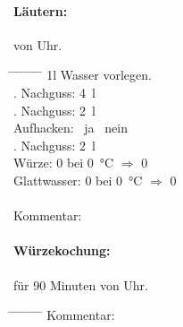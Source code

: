 \documentclass[12pt,oneside,a4paper]{scrartcl}
\begin{document}
{\paragraph{Läutern:} von  Uhr.
	\begin{tabbing}
		\hspace{1cm} \= \hspace{1cm} \= \hspace{1cm} \= \hspace{1cm} \= \hspace{1cm} \=\hspace{1cm} \=\hspace{1cm} \=\hspace{1cm} \= \kill
		\> 1l Wasser vorlegen.\\
		\> . Nachguss: \> \> \> \SI{4}{\litre}\\
		\> . Nachguss: \> \> \> \SI{2}{\litre}\\
		\> \> \> Aufhacken: \> \> \Square \ ja \> \> \Square \ nein\\
		\> . Nachguss: \> \> \> \SI{2}{\litre}\\
		\> Würze: \> \> \> \SI{0}{\plato} \> bei \> \SI{0}{\degreeCelsius} \> $\Rightarrow$ \> \SI{0}{\plato}\\
		\> Glattwasser: \> \> \> \SI{0}{\plato} \> bei \> \SI{0}{\degreeCelsius} \> $\Rightarrow$ \> \SI{0}{\plato}\\\\
		\> Kommentar: \>\>\> 
	\end{tabbing}
%
\paragraph{Würzekochung:} für 90 Minuten von Uhr.
	\begin{tabbing}
		\hspace{1cm} \= \hspace{1cm} \= \hspace{1cm} \= \hspace{1cm} \= \hspace{1cm} \= \hspace{1cm} \= \hspace{1cm} \= \hspace{1cm} \= \kill
		\> Kommentar: \> \> \> 
	\end{tabbing}
%
}
\end{document}
